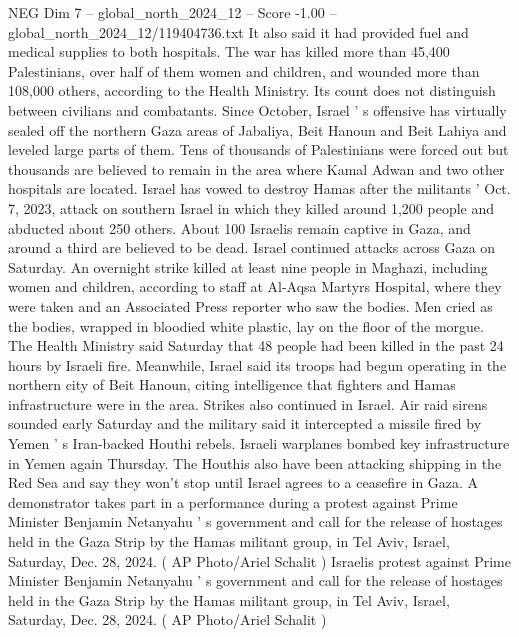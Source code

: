 \begin{textsample}{NEG Dim 7 – global\_north\_2024\_12 – Score -1.00 – global\_north\_2024\_12/119404736.txt}
It also said it had provided fuel and medical supplies to both hospitals.
The war has killed more than 45,400 Palestinians, over half of them women and children, and wounded more than 108,000 others, according to the Health Ministry.
Its count does not distinguish between civilians and combatants.
Since October, Israel ' s offensive has virtually sealed off the northern Gaza areas of Jabaliya, Beit Hanoun and Beit Lahiya and leveled large parts of them.
Tens of thousands of Palestinians were forced out but thousands are believed to remain in the area where Kamal Adwan and two other hospitals are located.
Israel has vowed to destroy Hamas after the militants ' Oct. 7, 2023, attack on southern Israel in which they killed around 1,200 people and abducted about 250 others.
About 100 Israelis remain captive in Gaza, and around a third are believed to be dead.
Israel continued attacks across Gaza on Saturday.
An overnight strike killed at least nine people in Maghazi, including women and children, according to staff at Al-Aqsa Martyrs Hospital, where they were taken and an Associated Press reporter who saw the bodies.
Men cried as the bodies, wrapped in bloodied white plastic, lay on the floor of the morgue.
The Health Ministry said Saturday that 48 people had been killed in the past 24 hours by Israeli fire.
Meanwhile, Israel said its troops had begun operating in the northern city of Beit Hanoun, citing intelligence that fighters and Hamas infrastructure were in the area.
Strikes also continued in Israel.
Air raid sirens sounded early Saturday and the military said it intercepted a missile fired by Yemen ' s Iran-backed Houthi rebels.
Israeli warplanes bombed key infrastructure in Yemen again Thursday.
The Houthis also have been attacking shipping in the Red Sea and say they won't stop until Israel agrees to a ceasefire in Gaza.
A demonstrator takes part in a performance during a protest against Prime Minister Benjamin Netanyahu ' s government and call for the release of hostages held in the Gaza Strip by the Hamas militant group, in Tel Aviv, Israel, Saturday, Dec. 28, 2024. ( AP Photo/Ariel Schalit ) Israelis protest against Prime Minister Benjamin Netanyahu ' s government and call for the release of hostages held in the Gaza Strip by the Hamas militant group, in Tel Aviv, Israel, Saturday, Dec. 28, 2024. ( AP Photo/Ariel Schalit )

\end{textsample}
